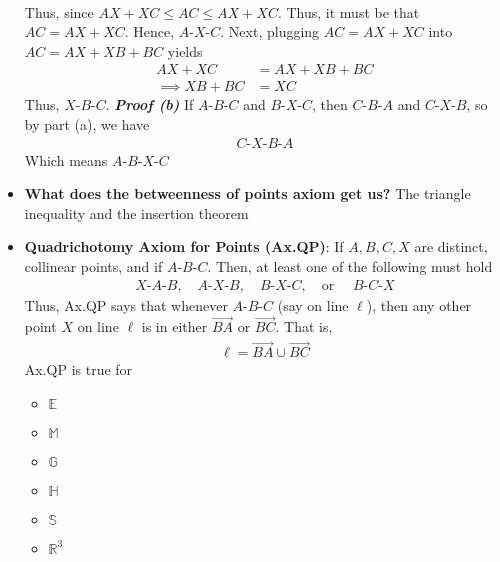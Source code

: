 \documentclass{report}
\begin{document}
\begin{itemize}
\begin{align*}
            \end{align*}
            Thus, since $AX + XC \leq AC \leq AX + XC$. Thus, it must be that $AC = AX + XC$. Hence, $ A\text{-}X\text{-}C $. Next, plugging $AC = AX + XC$ into $AC = AX + XB + BC$ yields
            \begin{align*}
                AX + XC &= AX + XB + BC \\
                \implies XB + BC &= XC
            \end{align*}
            Thus, $ X\text{-}B\text{-}C $.
            \bigbreak \noindent 
            \textbf{\textit{Proof (b)}} If $ A\text{-}B\text{-}C$ and $ B\text{-}X\text{-}C$, then $ C\text{-}B\text{-}A$ and $ C\text{-}X\text{-}B $, so by part (a), we have
            \begin{align*}
                C\text{-}X\text{-}B\text{-}A
            \end{align*}
            Which means $ A\text{-}B\text{-}X\text{-}C$ \endpf
        \item \textbf{What does the betweenness of points axiom get us?} The triangle inequality and the insertion theorem 
        \item \textbf{Quadrichotomy Axiom for Points (Ax.QP)}: If $A,B,C,X$ are distinct, collinear points, and if $ A\text{-}B\text{-}C$. Then, at least one of the following must hold
            \begin{align*}
                X\text{-}A\text{-}B, \quad A\text{-}X\text{-}B, \quad B\text{-}X\text{-}C, \quad \text{or } \quad B\text{-}C\text{-}X
            \end{align*}
            \bigbreak \noindent 
            Thus, Ax.QP says that whenever $ A\text{-}B\text{-}C$ (say on line $\ell$), then any other point $X$ on line $\ell$ is in either $ \overrightarrow{BA} $ or $ \overrightarrow{BC} $. That is,
            \begin{align*}
                \ell = \overrightarrow{BA} \cup \overrightarrow{BC}
            \end{align*}
            \bigbreak \noindent 
            Ax.QP is true for
            \begin{itemize}
                \item $\mathbb{E}$
                \item $\mathbb{M}$
                \item $\mathbb{G}$
                \item $\mathbb{H}$
                \item $\mathbb{S}$
                \item $\mathbb{R}^{3}$

\end{itemize}
\end{itemize}
\end{document}
